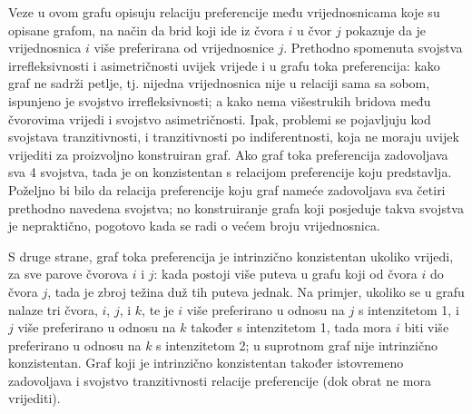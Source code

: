 \documentclass[lmodern, utf8, diplomski, numeric]{fer}
\begin{document}
  Veze u ovom grafu opisuju relaciju preferencije među vrijednosnicama koje su opisane grafom, na način da brid koji ide iz čvora $i$ u čvor $j$ pokazuje da je vrijednosnica $i$ više preferirana od vrijednosnice $j$.
  Prethodno spomenuta svojstva irrefleksivnosti i asimetričnosti uvijek vrijede i u grafu toka preferencija:
  kako graf ne sadrži petlje, tj. nijedna vrijednosnica nije u relaciji sama sa sobom, ispunjeno je svojstvo irrefleksivnosti; a kako nema višestrukih bridova među čvorovima vrijedi i svojstvo asimetričnosti.
  Ipak, problemi se pojavljuju kod svojstava tranzitivnosti, i tranzitivnosti po indiferentnosti, koja ne moraju uvijek vrijediti za proizvoljno konstruiran graf.
  Ako graf toka preferencija zadovoljava sva 4 svojstva, tada je on konzistentan s relacijom preferencije koju predstavlja.
  Poželjno bi bilo da relacija preferencije koju graf nameće zadovoljava sva četiri prethodno navedena svojstva; no konstruiranje grafa koji posjeduje takva svojstva je nepraktično, pogotovo kada se radi o većem broju vrijednosnica.
  
  S druge strane, graf toka preferencija je intrinzično konzistentan ukoliko vrijedi, za sve parove čvorova $i$ i $j$: kada postoji više puteva u grafu koji od čvora $i$ do čvora $j$, tada je zbroj težina duž tih puteva jednak.
  Na primjer, ukoliko se u grafu nalaze tri čvora, $i$, $j$, i $k$, te je $i$ više preferirano u odnosu na $j$ s intenzitetom 1, i $j$ više preferirano u odnosu na $k$ također s intenzitetom 1, tada mora $i$ biti više preferirano u odnosu na $k$ s intenzitetom 2; u suprotnom graf nije intrinzično konzistentan.
  Graf koji je intrinzično konzistentan također istovremeno zadovoljava i svojstvo tranzitivnosti relacije preferencije (dok obrat ne mora vrijediti).
  
\end{document}
